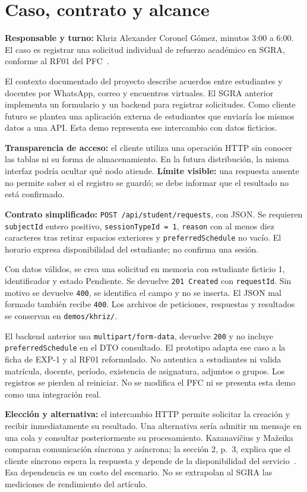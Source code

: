 \section*{Caso, contrato y alcance}
\textbf{Responsable y turno:} Khriz Alexander Coronel Gómez, minutos 3:00 a 6:00. El caso es registrar una solicitud individual de refuerzo académico en SGRA, conforme al RF01 del PFC~\cite{sgra-rf01-khriz}.

El contexto documentado del proyecto describe acuerdos entre estudiantes y docentes por WhatsApp, correo y encuentros virtuales. El SGRA anterior implementa un formulario y un backend para registrar solicitudes. Como cliente futuro se plantea una aplicación externa de estudiantes que enviaría los mismos datos a una API. Esta demo representa ese intercambio con datos ficticios.

\textbf{Transparencia de acceso:} el cliente utiliza una operación HTTP sin conocer las tablas ni su forma de almacenamiento. En la futura distribución, la misma interfaz podría ocultar qué nodo atiende. \textbf{Límite visible:} una respuesta ausente no permite saber si el registro se guardó; se debe informar que el resultado no está confirmado.

\textbf{Contrato simplificado:} \texttt{POST /api/student/requests}, con JSON. Se requieren \texttt{subjectId} entero positivo, \texttt{sessionTypeId = 1}, \texttt{reason} con al menos diez caracteres tras retirar espacios exteriores y \texttt{preferredSchedule} no vacío. El horario expresa disponibilidad del estudiante; no confirma una sesión.

Con datos válidos, se crea una solicitud en memoria con estudiante ficticio 1, identificador y estado Pendiente. Se devuelve \texttt{201 Created} con \texttt{requestId}. Sin motivo se devuelve \texttt{400}, se identifica el campo y no se inserta. El JSON mal formado también recibe \texttt{400}. Los archivos de peticiones, respuestas y resultados se conservan en \texttt{demos/khriz/}.

El backend anterior usa \texttt{multipart/form-data}, devuelve \texttt{200} y no incluye \texttt{preferredSchedule} en el DTO consultado. El prototipo adapta ese caso a la ficha de EXP-1 y al RF01 reformulado. No autentica a estudiantes ni valida matrícula, docente, período, existencia de asignatura, adjuntos o grupos. Los registros se pierden al reiniciar. No se modifica el PFC ni se presenta esta demo como una integración real.

\textbf{Elección y alternativa:} el intercambio HTTP permite solicitar la creación y recibir inmediatamente su resultado. Una alternativa sería admitir un mensaje en una cola y consultar posteriormente su procesamiento. Kazanavi{\v{c}}ius y Ma{\v{z}}eika comparan comunicación síncrona y asíncrona; la sección 2, p.~3, explica que el cliente síncrono espera la respuesta y depende de la disponibilidad del servicio~\cite{kazanavicius-comunicacion-2023-khriz}. Esa dependencia es un costo del escenario. No se extrapolan al SGRA las mediciones de rendimiento del artículo.

